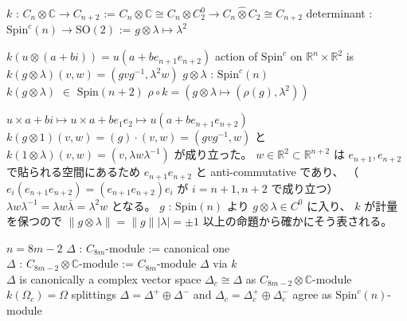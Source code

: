 \begin{Definition}
\itemdefi
  \Define \(k\) : \(C_n \otimes \mathbb{C} \to C_{n+2}\) := \(C_n \otimes \mathbb{C} \cong C_n \otimes C_2^0 \to C_n \hat{\otimes} C_2 \cong C_{n+2}\)
\itemdefi
  \Define determinant : \(\text{Spin}^c(n) \to \text{SO}(2)\) := \(g \otimes \lambda \mapsto \lambda^2\)
\end{Definition}

\begin{Theorem}
\itemprop
  \Then \(k(u \otimes (a + bi)) = u(a + b e_{n+1} e_{n+2})\)
\itemprop
  \Then action of \(\text{Spin}^c\) on \(\mathbb{R}^{n} \times \mathbb{R}^2\) is \(k(g \otimes \lambda)(v,w) = (g v g^{-1} , \lambda^2 w)\)
\itemprop
  \For \(g \otimes \lambda\) : \(\text{Spin}^c(n)\) \\
  \Then \(k(g \otimes \lambda)\) \(\in\) \(\text{Spin}(n+2)\)
\itemprop
  \Then \(\rho \circ k = (g \otimes \lambda \mapsto (\rho(g), \lambda^2))\)
\end{Theorem}

\begin{Proof}
\itemprof
  \(u \times a + bi \mapsto u \times a + b e_1 e_2 \mapsto u (a + b e_{n+1} e_{n+2})\)
\itemprof
  \(k(g \otimes 1)(v,w) = (g) \cdot (v,w) = (g v g^{-1}, w)\) と \(k(1 \otimes \lambda)(v,w) = (v , \lambda w \lambda^{-1})\) が成り立った。
  \(w \in \mathbb{R}^2 \subset \mathbb{R}^{n+2}\) は \(e_{n+1} , e_{n+2}\) で貼られる空間にあるため \(e_{n+1} e_{n+2}\) と anti-commutative であり、 （ \(e_i (e_{n+1} e_{n+2}) = (e_{n+1} e_{n+2}) e_{i}\) が \(i=n+1,n+2\) で成り立つ） \(\lambda w \lambda^{-1} = \lambda w \bar{\lambda} = \lambda^2 w\) となる。
\itemprof
  \(g\) : \(\text{Spin}(n)\) より \(g \otimes \lambda \in C^0\) に入り、 \(k\) が計量を保つので \(\lVert g \otimes \lambda \rVert = \lVert g \rVert \lvert \lambda \rvert = \pm 1\)
\itemprof
  以上の命題から確かにそう表される。
\end{Proof}

\begin{Theorem}
\itemwhen \(n = 8m - 2\)
\itemprop
  \Let \(\Delta\) : \(C_{8m}\)-module := canonical one \\
  \Let \(\Delta\) : \(C_{8m-2} \otimes \mathbb{C}\)-module := \(C_{8m}\)-module \(\Delta\) via \(k\) \\
  \Then \(\Delta\) is canonically a complex vector space
\itemprop
  \Then \(\Delta_c \cong \Delta\) as \(C_{8m-2} \otimes \mathbb{C}\)-module \\
  \Then \(k(\Omega_c) = \Omega\)
\itemprop
  \Then splittings \(\Delta = \Delta^+ \oplus \Delta^-\) and \(\Delta_c = \Delta_c^+ \oplus \Delta_c^-\) agree as \(\text{Spin}^c(n)\)-module
\end{Theorem}

